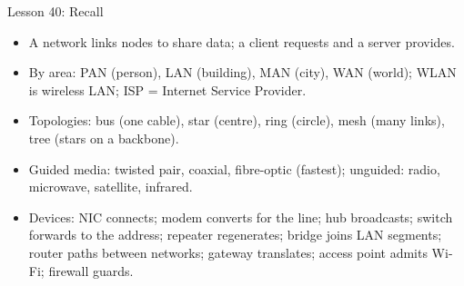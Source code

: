 \documentclass[aspectratio=169]{beamer}
\begin{document}
\begin{frame}{Lesson 40: Recall}
  \begin{itemize}
    \item A network links nodes to share data; a client requests and a
      server provides.
    \item By area: PAN (person), LAN (building), MAN (city), WAN (world);
      WLAN is wireless LAN; ISP = Internet Service Provider.
    \item Topologies: bus (one cable), star (centre), ring (circle), mesh
      (many links), tree (stars on a backbone).
    \item Guided media: twisted pair, coaxial, fibre-optic (fastest);
      unguided: radio, microwave, satellite, infrared.
    \item Devices: NIC connects; modem converts for the line; hub
      broadcasts; switch forwards to the address; repeater regenerates;
      bridge joins LAN segments; router paths between networks; gateway
      translates; access point admits Wi-Fi; firewall guards.
  \end{itemize}
\end{frame}
\end{document}
